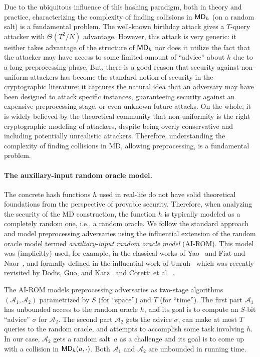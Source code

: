Due to the ubiquitous influence of this hashing paradigm, both in theory and practice, characterizing the complexity of finding collisions in $\mathsf{MD}_h$ (on a random salt) is a fundamental problem. The well-known birthday attack gives a $T$-query attacker with $\Theta(T^2/N)$ advantage. However, this attack is very generic: it neither takes advantage of the structure of $\mathsf{MD}_h$ nor does it utilize the fact that the attacker may have access to some limited amount of ``advice'' about $h$ due to a long preprocessing phase. But, there is a good reason that security against non-uniform attackers has become the
standard notion of security in the cryptographic literature: it captures the natural idea that an adversary may have been designed to attack specific instances, guaranteeing security against an expensive preprocessing stage, or even unknown future attacks.  On the whole, it is widely believed by the theoretical community that non-uniformity is the right
cryptographic modeling of attackers, despite being overly conservative and including potentially
unrealistic attackers.
Therefore, understanding the complexity of finding collisions in MD, allowing preprocessing, is a fundamental problem.

\paragraph{The auxiliary-input random oracle model.}
The concrete hash functions $h$ used in real-life do not have solid theoretical foundations from the perspective of provable security. Therefore, when analyzing the security of the MD construction, the function $h$ is typically modeled as a completely random one, i.e., a random oracle.
We follow the standard approach and model preprocessing adversaries using the influential extension of the random oracle model termed  \emph{auxiliary-input random oracle model} (AI-ROM). This model was (implicitly) used, for example, in the classical works of Yao~\cite{Yao90} and Fiat and Naor~\cite{FiatN99}, and formally defined in the influential work of Unruh~\cite{Unruh07} which was recently revisited by Dodis, Guo, and Katz~\cite{DodisGK17} and Coretti et al.~\cite{CorettiDGS18}.


The AI-ROM models preprocessing adversaries as two-stage algorithms $(\mathcal {A}_1,\allowbreak\mathcal{A}_2)$ parametrized by $S$ (for ``space'') and $T$ (for ``time''). The first part $\mathcal A_1$ has unbounded access to the random oracle $h$, and its goal is to compute an $S$-bit ``advice'' $\sigma$ for $\mathcal A_2$. The second part $\mathcal A_2$ gets the advice $\sigma$, can make at most $T$ queries to the random oracle, and attempts to accomplish some task involving $h$. In our case, $\mathcal A_2$ gets a random salt~$a$ as a challenge and its goal is to come up with a collision in $\mathsf{MD}_h(a,\cdot)$. Both $\mathcal A_1$ and $\mathcal A_2$ are unbounded in running time. 

